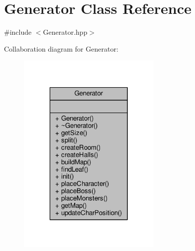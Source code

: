 \hypertarget{class_generator}{\section{Generator Class Reference}
\label{class_generator}
}


{\ttfamily \#include $<$Generator.\-hpp$>$}



Collaboration diagram for Generator\-:\nopagebreak
\begin{figure}[H]
\begin{center}
\leavevmode
\includegraphics[width=196pt]{class_generator__coll__graph}
\end{center}
\end{figure}
